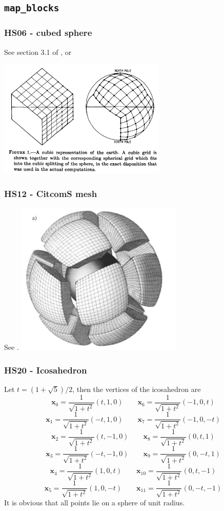  \subsection{\tt map\_blocks}
 \subsubsection{HS06 - cubed sphere}
 See section 3.1 of \cite{puli07}, or \cite{sado72,natl05}
 
 \includegraphics[width=8cm]{images/sado72}
 \subsubsection{HS12 - CitcomS mesh}
 See \cite{zhzm00,zhmt08}.
 \includegraphics[width=8cm]{images/citcoms}
 \subsubsection{HS20 - Icosahedron}
 Let $t=(1+\sqrt{5})/2$, then the vertices of the icosahedron are 
 \[
 {\bm x}_0=\frac{1}{\sqrt{1+t^2}}(t,1,0) \quad\quad {\bm x}_6=\frac{1}{\sqrt{1+t^2}}(-1,0,t)
 \]
 \[
 {\bm x}_1=\frac{1}{\sqrt{1+t^2}}(-t,1,0) \quad\quad {\bm x}_7=\frac{1}{\sqrt{1+t^2}}(-1,0,-t)
 \]
 \[
 {\bm x}_2=\frac{1}{\sqrt{1+t^2}}(t,-1,0) \quad\quad {\bm x}_8=\frac{1}{\sqrt{1+t^2}}(0,t,1)
 \]
 \[
 {\bm x}_3=\frac{1}{\sqrt{1+t^2}}(-t,-1,0) \quad\quad {\bm x}_9=\frac{1}{\sqrt{1+t^2}}(0,-t,1)
 \]
 \[
 {\bm x}_4=\frac{1}{\sqrt{1+t^2}}(1,0,t) \quad\quad {\bm x}_{10}=\frac{1}{\sqrt{1+t^2}}(0,t,-1)
 \]
 \[
 {\bm x}_5=\frac{1}{\sqrt{1+t^2}}(1,0,-t) \quad\quad {\bm x}_{11}=\frac{1}{\sqrt{1+t^2}}(0,-t,-1)
 \]
 It is obvious that all points lie on a sphere of unit radius.

